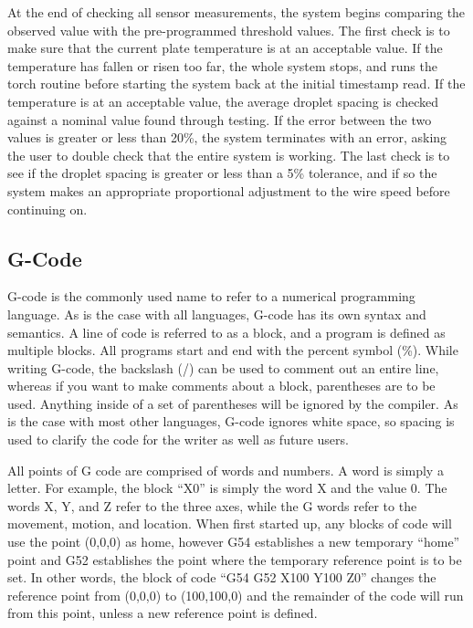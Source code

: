 \documentclass[12pt]{article}
\newlength\tindent
\renewcommand{\indent}{\hspace*{\tindent}}
\begin{document}
\indent	At the end of checking all sensor measurements, the system begins comparing the observed value with the pre-programmed threshold values. The first check is to make sure that the current plate temperature is at an acceptable value. If the temperature has fallen or risen too far, the whole system stops, and runs the torch routine before starting the system back at the initial timestamp read. If the temperature is at an acceptable value, the average droplet spacing is checked against a nominal value found through testing. If the error between the two values is greater or less than 20\%, the system terminates with an error, asking the user to double check that the entire system is working. The last check is to see if the droplet spacing is greater or less than a 5\% tolerance, and if so the system makes an appropriate proportional adjustment to the wire speed before continuing on.

\subsection{G-Code}

\indent G-code is the commonly used name to refer to a numerical programming language. As is the case with all languages, G-code has its own syntax and semantics.  A line of code is referred to as a block, and a program is defined as multiple blocks. All programs start and end with the percent symbol (\%). While writing G-code, the backslash (/) can be used to comment out an entire line, whereas if you want to make comments about a block, parentheses are to be used. Anything inside of a set of parentheses will be ignored by the compiler. As is the case with most other languages, G-code ignores white space, so spacing is used to clarify the code for the writer as well as future users.

\indent All points of G code are comprised of words and numbers. A word is simply a letter. For example, the block “X0” is simply the word X and the value 0. The words X, Y, and Z refer to the three axes, while the G words refer to the movement, motion, and location. When first started up, any blocks of code will use the point (0,0,0) as home, however G54 establishes a new temporary “home” point and G52 establishes the point where the temporary reference point is to be set. In other words, the block of code “G54 G52 X100 Y100 Z0” changes the reference point from (0,0,0) to (100,100,0) and the remainder of the code will run from this point, unless a new reference point is defined.
\end{document}
